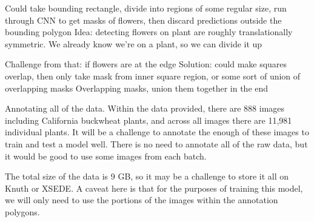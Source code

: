 \documentclass[10pt,twocolumn,letterpaper]{article}
\begin{document}
Could take bounding rectangle, divide into regions of some regular size, run through CNN to get masks of flowers, then discard predictions outside the bounding polygon
Idea: detecting flowers on plant are roughly translationally symmetric. We already know we're on a plant, so we can divide it up

Challenge from that: if flowers are at the edge
Solution: could make squares overlap, then only take mask from inner square region, or some sort of union of overlapping masks
Overlapping masks, union them together in the end

Annotating all of the data. Within the data provided, there are 888 images including California buckwheat plants, and across all images there are 11,981 individual plants. It will be a challenge to annotate the enough of these images to train and test a model well. There is no need to annotate all of the raw data, but it would be good to use some images from each batch.

The total size of the data is 9 GB, so it may be a challenge to store it all on Knuth or XSEDE. A caveat here is that for the purposes of training this model, we will only need to use the portions of the images within the annotation polygons.

{\small


}
\end{document}
